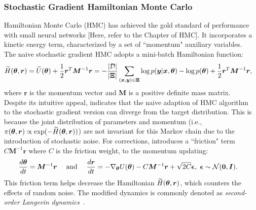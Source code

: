 \subsubsection{Stochastic Gradient Hamiltonian Monte Carlo}
Hamiltonian Monte Carlo (HMC) has achieved the gold standard of performance with small neural networks [Here, refer to the Chapter of HMC]. It incorporates a kinetic energy term, characterized by a set of ``momentum" auxiliary variables. The naive stochastic gradient HMC adopts a mini-batch Hamiltonian function:
\begin{equation}
    \widetilde{H}(\bm{\theta},\bm{r})=\widetilde{U}(\bm{\theta})+\frac{1}{2}\bm{r}^T\bm{M}^{-1}\bm{r}=-\frac{|\mathcal{D}|}{|\bm{\Xi}|}\sum_{(\bm{x}, \bm{y}) \in\bm{\Xi}}\log{p(\bm{y}|\bm{x}, \bm{\theta})}-\log{p(\bm{\theta})}+\frac{1}{2}\bm{r}^T\bm{M}^{-1}\bm{r},
\end{equation}
where $\bm{r}$ is the momentum vector and $\bm{M}$ is a positive definite mass matrix. 
Despite its intuitive appeal, \citet{chen2014stochastic} indicates that the naive adaption of HMC algorithm to the stochastic gradient version can diverge from the target distribution. This is because the joint distribution of parameters and momentum (i.e., $\pi(\bm{\theta},\bm{r})\propto\exp(-\widetilde{H}(\bm{\theta},\bm{r}))$) are not invariant for this Markov chain due to the introduction of stochastic noise. For corrections, \citet{chen2014stochastic} introduces a ``friction" term $C\bm{M}^{-1}\bm{r}$ where $C$ is the friction weight, to the momentum updating:
\begin{equation}
    \frac{d\bm{\theta}}{dt}=\bm{M}^{-1}\bm{r}~~~~\text{and}~~~~\frac{d\bm{r}}{dt}=-\nabla_{\bm{\theta}}U(\bm{\theta})-C\bm{M}^{-1}\bm{r}+\sqrt{2C}\bm{\epsilon}, \ \bm{\epsilon} \sim \mathcal{N}(\bm{0},\bm{I}).
\end{equation}
This friction term helps decrease the Hamiltonian $\widetilde{H}(\bm{\theta},\bm{r})$, which counters the effects of random noise. The modified dynamics is commonly denoted as \emph{second-order Langevin dynamics}~\citep{wang1945theory}.


